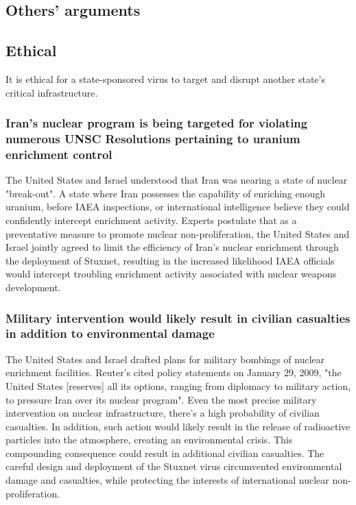 \documentclass[12pt]{article}
\begin{document}
\begin{multicols}{2}
\section{Others' arguments}

\subsection{Ethical}

It is ethical for a state-sponsored virus to target and disrupt another state's critical infrastructure.

\subsubsection{Iran's nuclear program is being targeted for violating numerous UNSC Resolutions pertaining to uranium enrichment control}

The United States and Israel understood that Iran was nearing a state of nuclear "break-out". A state where Iran possesses the capability of enriching enough uranium, before IAEA inspections, or international intelligence believe they could confidently intercept enrichment activity. Experts postulate that as a preventative measure to promote nuclear non-proliferation, the United States and Israel jointly agreed to limit the efficiency of Iran's nuclear enrichment through the deployment of Stuxnet, resulting in the increased likelihood IAEA officials would intercept troubling enrichment activity associated with nuclear weapons development.\cite{theRealStoryOfStuxnet}

\subsubsection{Military intervention would likely result in civilian casualties in addition to environmental damage}

The United States and Israel drafted plans for military bombings of nuclear enrichment facilities. Reuter's cited policy statements on January 29, 2009, "the United States [reserves] all its options, ranging from diplomacy to military action, to pressure Iran over its nuclear program".\cite{usOptionsForIran} Even the most precise military intervention on nuclear infrastructure, there's a high probability of civilian casualties. In addition, such action would likely result in the release of radioactive particles into the atmosphere, creating an environmental crisis. This compounding consequence could result in additional civilian casualties. The careful design and deployment of the Stuxnet virus circumvented environmental damage and casualties, while protecting the interests of international nuclear non-proliferation.


\end{multicols}
\end{document}
